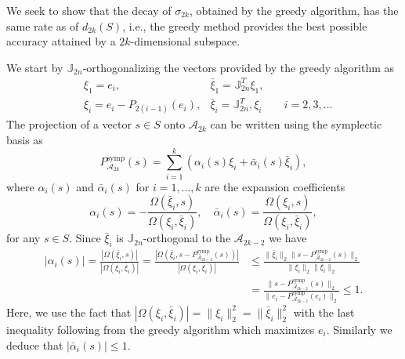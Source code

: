 We seek to show that the decay of $\sigma_{2k}$, obtained by the greedy algorithm, has the same rate as of $d_{2k}(S)$, i.e., the greedy method provides the best possible accuracy attained by a $2k$-dimensional subspace.

We start by $\mathbb J_{2n}$-orthogonalizing the vectors provided by the greedy algorithm as
\begin{equation} \label{eq:new6}
\begin{aligned}
	& \xi_1 = e_i, & \bar{\xi}_1 = \mathbb{J}_{2n}^T \xi_1, &\\
	& \xi_i = e_i - P_{2(i-1)} (e_i), & \bar{\xi}_i = \mathbb{J}_{2n}^T, \xi_i &\quad i = 2,3,\dots
\end{aligned}
\end{equation}
The projection of a vector $s\in S$ onto $\mathcal A_{2k}$ can be written using the symplectic basis as
\begin{equation} \label{eq:new7}
	P_{\mathcal A_{2k}}^{\text{symp}}(s) = \sum_{i=1}^k \left( \alpha_i(s) \xi_i + \bar{\alpha}_i(s) \bar{\xi}_i \right),
\end{equation}
where $\alpha_i(s)$ and $\bar{\alpha}_i(s)$ for $i=1,\dots,k$ are the expansion coefficients
\begin{equation} \label{eq:new8}
	\alpha_i(s) = - \frac{\Omega(\bar{\xi}_i,s)}{\Omega(\xi_i,\bar{\xi}_i)}, \quad \bar{\alpha}_i(s) = \frac{\Omega(\xi_i,s)}{\Omega(\xi_i,\bar{\xi}_i)},
\end{equation}
for any $s\in S$. Since $\bar{\xi}_i$ is $\mathbb J_{2n}$-orthogonal to the $\mathcal A_{2k-2}$ we have
\begin{equation} \label{eq:new9}
\begin{aligned}
	|\alpha_i(s)| = \frac{|\Omega(\bar{\xi}_i,s)|}{|\Omega(\xi_i,\bar{\xi}_i)|} = \frac{|\Omega( \bar{\xi}_i, s - P_{\mathcal A_{2k-2}}^{\text{symp}}(s))|}{|\Omega(\xi_i,\bar{\xi}_i)|}  &\leq \frac{\|\bar{\xi}_i\|_2 \| s - P_{\mathcal A_{2k-2}}^{\text{symp}}(s) \|_2}{ \|\xi_i\|_2 \|\bar{\xi}_i\|_2 } \\
	&= \frac{\| s - P_{\mathcal A_{2k-2}}^{\text{symp}}(s) \|_2}{\| e_i - P_{\mathcal A_{2k-2}}^{\text{symp}}(e_i) \|_2} \leq 1.
\end{aligned}
\end{equation}
Here, we use the fact that $ |\Omega(\xi_i,\bar{\xi}_i)| = \| \xi_i \|^2_2 = \|\bar{\xi}_i\|^2_2$ with the last inequality following from the greedy algorithm which maximizes $e_i$. Similarly we deduce that $|\bar{\alpha}_i(s)|\leq 1$.

